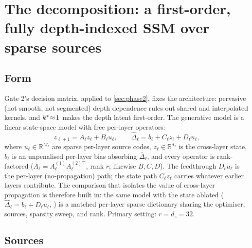 \section{The decomposition: a first-order, fully depth-indexed SSM over sparse
sources}
\label{sec:decomposition}

\subsection{Form}
\label{sec:decomposition:form}

Gate 2's decision matrix, applied to \cref{sec:phase2}, fixes the
architecture: pervasive (not smooth, not segmented) depth dependence rules out
shared and interpolated kernels, and $k^{\ast}\!\approx\!1$ makes the depth
latent first-order. The generative model is a linear state-space model with
free per-layer operators:
\begin{equation}
  z_{\ell+1} = A_\ell z_\ell + B_\ell u_\ell, \qquad
  \hat\Delta_\ell = b_\ell + C_\ell z_\ell + D_\ell u_\ell,
  \label{eq:ssm}
\end{equation}
where $u_\ell \in \mathbb{R}^{M_\ell}$ are sparse per-layer source codes,
$z_\ell \in \mathbb{R}^{d_z}$ is the cross-layer state, $b_\ell$ is an
unpenalised per-layer bias absorbing $\bar\Delta_\ell$, and every operator is
rank-factored ($A_\ell = A^{(1)}_\ell A^{(2)\top}_\ell$, rank $r$; likewise
$B, C, D$). The feedthrough $D_\ell u_\ell$ is the per-layer (no-propagation)
path; the state path $C_\ell z_\ell$ carries whatever earlier layers
contribute. The comparison that isolates the value of cross-layer propagation
is therefore built in: the same model with the state ablated
($\hat\Delta_\ell = b_\ell + D_\ell u_\ell$, ) is a
matched per-layer sparse dictionary sharing the optimiser, sources, sparsity
sweep, and rank. Primary setting: $r = d_z = 32$.

\subsection{Sources}
\label{sec:decomposition:sources}

